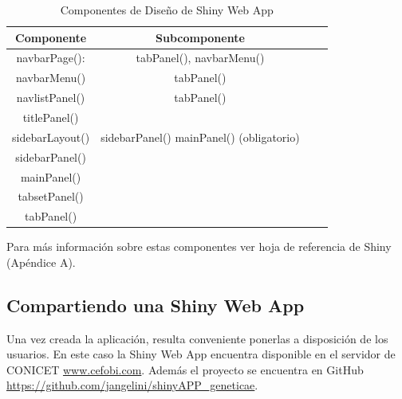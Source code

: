 {\small
\begin{table}[h]
\begin{center}
\caption{Componentes de Diseño de Shiny Web App}
\label{tab:tabla2}
\resizebox{0.6\textwidth}{!} {
\begin{tabular}{cccc}
\hline 
Componente	& Subcomponente	 \\
\hline
navbarPage(): & tabPanel(), navbarMenu()\\
navbarMenu() & tabPanel() \\
navlistPanel() & tabPanel()\\
titlePanel() &	\\
sidebarLayout() & sidebarPanel()  mainPanel() (obligatorio)	\\
sidebarPanel() & \\
mainPanel() & \\
tabsetPanel() &	\\
tabPanel()	 & \\
\hline
\end{tabular}
}
\end{center}
\end{table}
}


Para más información sobre estas componentes ver hoja de referencia de Shiny (Apéndice A).


\subsection{Compartiendo una Shiny Web App}

Una vez creada la aplicación, resulta conveniente ponerlas a disposición de los usuarios. En este caso la Shiny Web App encuentra disponible en el servidor de CONICET \url{www.cefobi.com}. Además el proyecto se encuentra en GitHub \url{https://github.com/jangelini/shinyAPP_geneticae}. 
